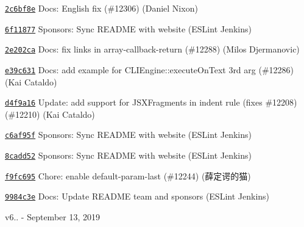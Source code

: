 \begin{DoxyItemize}
\item \href{https://github.com/eslint/eslint/commit/2c6bf8ea9c8a8f94746f980bd5bea0a8c5c4d6b7}{\texttt{ {\ttfamily 2c6bf8e}}} Docs\+: English fix (\#12306) (Daniel Nixon)
\item \href{https://github.com/eslint/eslint/commit/6f118778366613fc53036cb6a7537e1b4c6e7af8}{\texttt{ {\ttfamily 6f11877}}} Sponsors\+: Sync README with website (ESLint Jenkins)
\item \href{https://github.com/eslint/eslint/commit/2e202ca2228846e6226aa8dd99c614d572fb86a8}{\texttt{ {\ttfamily 2e202ca}}} Docs\+: fix links in array-\/callback-\/return (\#12288) (Milos Djermanovic)
\item \href{https://github.com/eslint/eslint/commit/e39c6318af0fd27edd5fd2aaf2b24a3e204005dd}{\texttt{ {\ttfamily e39c631}}} Docs\+: add example for CLIEngine\+::execute\+On\+Text 3rd arg (\#12286) (Kai Cataldo)
\item \href{https://github.com/eslint/eslint/commit/d4f9a16af7e00021e2ed63823d9c2f149bc985d6}{\texttt{ {\ttfamily d4f9a16}}} Update\+: add support for JSXFragments in indent rule (fixes \#12208) (\#12210) (Kai Cataldo)
\item \href{https://github.com/eslint/eslint/commit/c6af95f5bf1ef10f08545d54fd52b98e85fdf7f7}{\texttt{ {\ttfamily c6af95f}}} Sponsors\+: Sync README with website (ESLint Jenkins)
\item \href{https://github.com/eslint/eslint/commit/8cadd5229b7372aed0d4785dcae15532a399bf55}{\texttt{ {\ttfamily 8cadd52}}} Sponsors\+: Sync README with website (ESLint Jenkins)
\item \href{https://github.com/eslint/eslint/commit/f9fc695d77c19cd5ecb3f0e97e1ea124c8543409}{\texttt{ {\ttfamily f9fc695}}} Chore\+: enable default-\/param-\/last (\#12244) (薛定谔的猫)
\item \href{https://github.com/eslint/eslint/commit/9984c3e27c92de76b8c05a58525dbcea12b10b83}{\texttt{ {\ttfamily 9984c3e}}} Docs\+: Update README team and sponsors (ESLint Jenkins)
\end{DoxyItemize}

v6.. -\/ September 13, 2019



